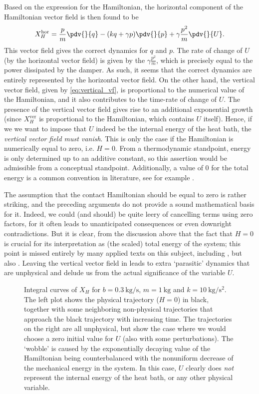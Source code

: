 Based on the expression for the Hamiltonian, the horizontal component of the Hamiltonian vector field is then found to be
$$ 
    X^\text{hor}_H = \frac{p}{m}\pdv{}{q} - ( kq + \gamma p)\pdv{}{p} + \gamma \frac{p^2}{m}\pdv{}{U}.
$$
This vector field gives the correct dynamics for $q$ and $p$. The rate of change of $U$ (by the horizontal vector field) is given by the $ 
\gamma \tfrac{p^2}{m}$, which is precisely equal to the power dissipated by the damper. As such, it seems that the correct dynamics are entirely represented by the horizontal vector field. On the other hand, the vertical vector field, given by \cref{eq:vertical_vf}, is proportional to the numerical value of the Hamiltonian, and it also contributes to the time-rate of change of $U$. The presence of the vertical vector field gives rise to an additional exponential growth (since $X_H^\text{ver}$ is proportional to the Hamiltonian, which contains $U$ itself). Hence, if we we want to impose that $U$ indeed be the internal energy of the heat bath, the \emph{vertical vector field must vanish}. This is only the case if the Hamiltonian is numerically equal to zero, i.e. $H = 0$. From a thermodynamic standpoint, energy is only determined up to an additive constant, so this assertion would be admissible from a conceptual standpoint. Additionally, a value of 0 for the total energy is a common convention in literature, see for example \citet{Fermi1936}. 

The assumption that the contact Hamiltonian should be equal to zero is rather striking, and the preceding arguments do not provide a sound mathematical basis for it. Indeed, we could (and should) be quite leery of cancelling terms using zero factors, for it often leads to unanticipated consequences or even downright contradictions. But it is clear, from the discussion above that the fact that $H = 0$ is crucial for its interpretation as (the scaled) total energy of the system; this point is missed entirely by many applied texts on this subject, including \citet{Bravetti2017}, but also \citet{valcazar2019}. Leaving the vertical vector field in leads to extra `parasitic' dynamics that are unphysical and delude us from the actual significance of the variable $U$.
\begin{figure}[ht!]
    \centering
    
    \caption{Integral curves of $X_H$ for $b = \SI{0.3}{\kilogram \per \second}$, $ m = \SI{1}{\kilogram}$ and  $k = \SI{10}{\kilogram \per \second \squared}$. The left plot shows the physical trajectory ($H = 0$) in black, together with some neighboring non-physical trajectories that approach the black trajectory with increasing time. The trajectories on the right are all unphysical, but show the case where we would choose a zero initial value for $U$ (also with some perturbations). The `wobble' is caused by the exponentially decaying value of the Hamiltonian being counterbalanced with the nonuniform decrease of the mechanical energy in the system. In this case, $U$ clearly does \emph{not} represent the internal energy of the heat bath, or any other physical variable.}
    \label{fig:dho_trajectories}
\end{figure}


